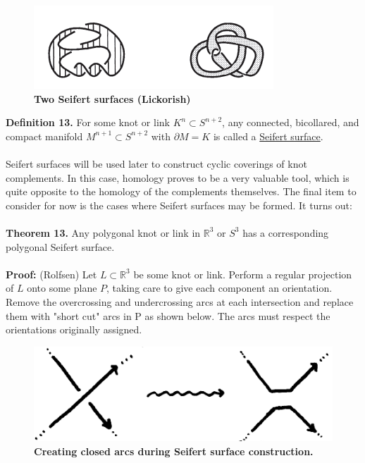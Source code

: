 \documentclass{article}
\begin{document}
\begin{figure}[h!]
	\begin{center}
	\includegraphics{seifert.png}
	\caption \textbf{Two Seifert surfaces (Lickorish)}
	\end{center}
\end{figure}

\noindent \textbf{Definition 13.} For some knot or link $K^n \subset S^{n+2}$, any connected, bicollared, and compact manifold $M^{n+1} \subset S^{n+2}$ with $\partial M = K$ is called a \underline{Seifert surface}.
\\
\\ 
Seifert surfaces will be used later to construct cyclic coverings of knot complements.  In this case, homology proves to be a very valuable tool, which is quite opposite to the homology of the complements themselves.  The final item to consider for now is the cases where Seifert surfaces may be formed. It turns out:
\\
\\
\textbf{Theorem 13.} Any polygonal knot or link in $\mathbb{R}^3$ or $S^3$ has a corresponding polygonal Seifert surface.
\\
\\
\textbf{Proof:} (Rolfsen) Let $L \subset \mathbb{R}^3$ be some knot or link.  Perform a regular projection of $L$ onto some plane $P$, taking care to give each component an orientation.  Remove the overcrossing and undercrossing arcs at each intersection and replace them with "short cut" arcs in P as shown below.  The arcs must respect the orientations originally assigned. 

\begin{figure}[h!]
	\begin{center}
	\includegraphics{shortcut.png}
	\caption \textbf{Creating closed arcs during Seifert surface construction.}
	\end{center}
\end{figure}
\end{document}

